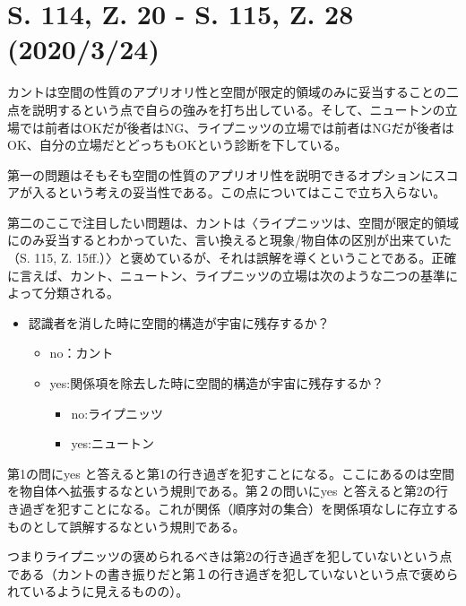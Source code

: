 \documentclass[12pt]{jsarticle}
\begin{document}
\section{S. 114, Z. 20 - S. 115, Z. 28 (2020/3/24)}
カントは空間の性質のアプリオリ性と空間が限定的領域のみに妥当することの二点を説明するという点で自らの強みを打ち出している。そして、ニュートンの立場では前者はOKだが後者はNG、ライプニッツの立場では前者はNGだが後者はOK、自分の立場だとどっちもOKという診断を下している。

第一の問題はそもそも空間の性質のアプリオリ性を説明できるオプションにスコアが入るという考えの妥当性である。この点についてはここで立ち入らない。

第二のここで注目したい問題は、カントは〈ライプニッツは、空間が限定的領域にのみ妥当するとわかっていた、言い換えると現象/物自体の区別が出来ていた（S. 115, Z. 15ff.）〉と褒めているが、それは誤解を導くということである。正確に言えば、カント、ニュートン、ライプニッツの立場は次のような二つの基準によって分類される。
\begin{itemize}
    \item 認識者を消した時に空間的構造が宇宙に残存するか？
    \begin{itemize}
        \item no：カント
        \item yes:関係項を除去した時に空間的構造が宇宙に残存するか？
        \begin{itemize}
            \item no:ライプニッツ
            \item yes:ニュートン
            
        \end{itemize}

            
        
    \end{itemize}
    
\end{itemize}
第1の問にyes と答えると第1の行き過ぎを犯すことになる。ここにあるのは空間を物自体へ拡張するなという規則である。第２の問いにyes と答えると第2の行き過ぎを犯すことになる。これが関係（順序対の集合）を関係項なしに存立するものとして誤解するなという規則である。

つまりライプニッツの褒められるべきは第2の行き過ぎを犯していないという点である（カントの書き振りだと第１の行き過ぎを犯していないという点で褒められているように見えるものの）。
\end{document}
